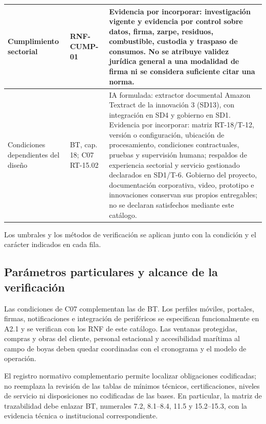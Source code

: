 \begin{longtable}{|L{0.136187\AnchoTablaAnexo}|L{0.186770\AnchoTablaAnexo}|L{0.677043\AnchoTablaAnexo}|}
Cumplimiento sectorial &
RNF-CUMP-01 &
Evidencia por incorporar: investigación vigente y evidencia por control sobre datos, firma, zarpe, residuos, combustible, custodia y traspaso de consumos. No se atribuye validez jurídica general a una modalidad de firma ni se considera suficiente citar una norma. \\ \hline
Condiciones dependientes del diseño &
BT, cap. 18; C07 RT-15.02 &
IA formulada: extractor documental Amazon Textract de la innovación 3 (SD13), con integración en SD4 y gobierno en SD1. Evidencia por incorporar: matriz RT-18/T-12, versión o configuración, ubicación de procesamiento, condiciones contractuales, pruebas y supervisión humana; respaldos de experiencia sectorial y servicio gestionado declarados en SD1/T-6. Gobierno del proyecto, documentación corporativa, video, prototipo e innovaciones conservan sus propios entregables; no se declaran satisfechos mediante este catálogo. \\ \hline
\end{longtable}

Los umbrales y los métodos de verificación se aplican junto con la condición y el carácter indicados en cada fila.
\subsection*{Parámetros particulares y alcance de la verificación}
Las condiciones de C07 complementan las de BT. Los perfiles móviles,
portales, firmas, notificaciones e integración de periféricos se especifican
funcionalmente en A2.1 y se verifican con los RNF de este catálogo.
Las ventanas protegidas, compras y obras del cliente, personal estacional
y accesibilidad marítima al campo de boyas deben quedar coordinadas con
el cronograma y el modelo de operación.

El registro normativo complementario permite localizar obligaciones codificadas;
no reemplaza la revisión de las tablas de mínimos técnicos, certificaciones,
niveles de servicio ni disposiciones no codificadas de las bases.
En particular, la matriz de trazabilidad debe enlazar BT, numerales 7.2,
8.1--8.4, 11.5 y 15.2--15.3, con la evidencia técnica o institucional correspondiente.
